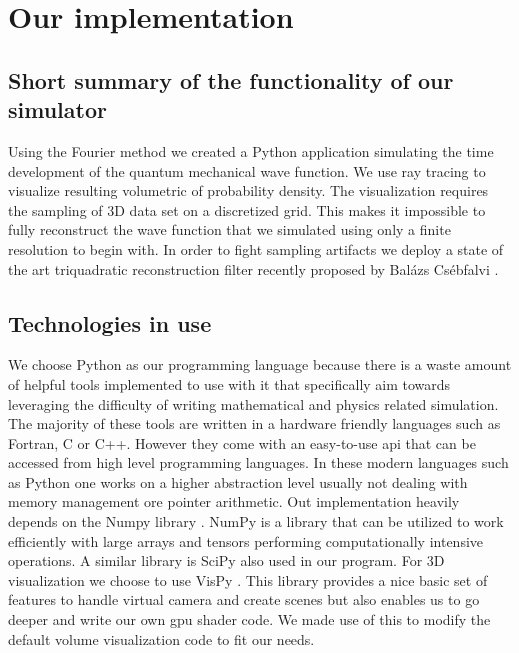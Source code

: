 \section{Our implementation}
\label{sec:our_implementation}

\subsection{Short summary of the functionality of our simulator}

Using the Fourier method we created a Python application simulating the time development of the quantum mechanical wave function.
We use ray tracing to visualize resulting volumetric of probability density.
The visualization requires the sampling of 3D data set on a discretized grid.
This makes it impossible to fully reconstruct the wave function that we simulated using only a finite resolution to begin with.
In order to fight sampling artifacts we deploy a state of the art triquadratic reconstruction filter recently proposed by Balázs Csébfalvi \cite{csebfalvi2023}.

\subsection{Technologies in use}

We choose Python \cite{van1995python} as our programming language because there is a waste amount of helpful tools implemented to use with it that specifically aim towards leveraging the difficulty of writing mathematical and physics related simulation.
The majority of these tools are written in a hardware friendly languages such as Fortran, C or C++.
However they come with an easy-to-use \acrfull{api} that can be accessed from high level programming languages.
In these modern languages such as Python one works on a higher abstraction level usually not dealing with memory management ore pointer arithmetic.
Out implementation heavily depends on the Numpy library \cite{harris2020array}.
NumPy is a library that can be utilized to work efficiently with large arrays and tensors performing computationally intensive operations.
A similar library is SciPy \cite{2020SciPy-NMeth} also used in our program.
For 3D visualization we choose to use VisPy \cite{vispy}.
This library provides a nice basic set of features to handle virtual camera and create scenes but also enables us to go deeper and write our own \acrshort{gpu} shader code.
We made use of this to modify the default volume visualization code to fit our needs.

